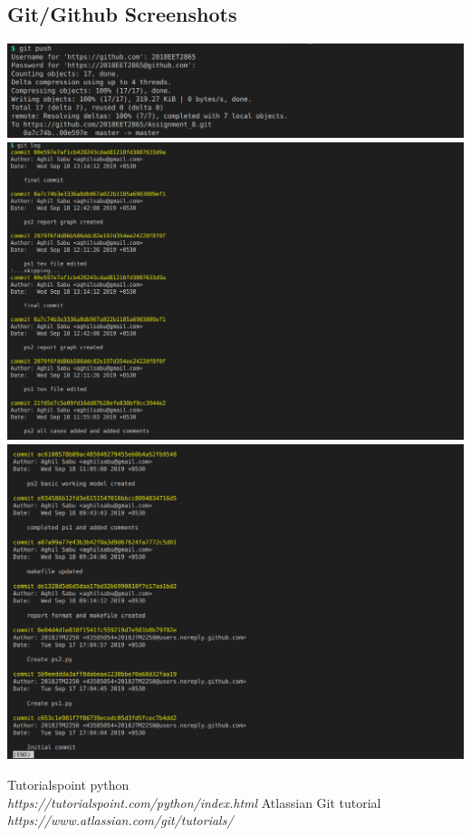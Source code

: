 \documentclass{article}
\begin{document}
    \subsection{Git/Github  Screenshots}
    \includegraphics[width=1.2\textwidth]{./images/gt_001.png}
    \includegraphics[width=1.2\textwidth]{./images/gt_002.png}
    \includegraphics[width=1.2\textwidth]{./images/gt_003.png}

	\begin{thebibliography}{9}
        Tutorialspoint python\\
        \textit{https://tutorialspoint.com/python/index.html}
        \newline
        Atlassian Git tutorial \\
        \textit{https://www.atlassian.com/git/tutorials/} 
    \end{thebibliography}
    
\end{document}
